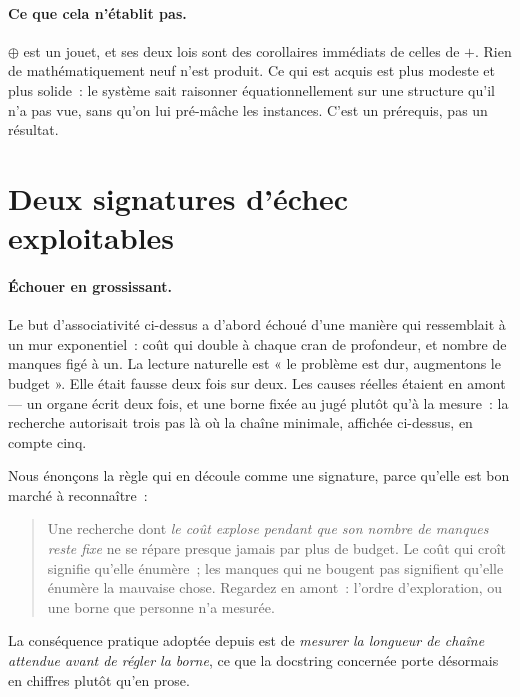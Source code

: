 \documentclass[11pt]{article}
\theoremstyle{remark}\newtheorem{remarque}{Remarque}
\begin{document}
\paragraph{Ce que cela n'établit pas.} $\oplus$ est un jouet, et ses deux lois sont des
corollaires immédiats de celles de $+$. Rien de mathématiquement neuf n'est produit. Ce
qui est acquis est plus modeste et plus solide~: le système sait raisonner
équationnellement sur une structure qu'il n'a pas vue, sans qu'on lui pré-mâche les
instances. C'est un prérequis, pas un résultat.

\section{Deux signatures d'échec exploitables}
\label{sec:signatures}

\paragraph{Échouer en grossissant.} Le but d'associativité ci-dessus a d'abord échoué
d'une manière qui ressemblait à un mur exponentiel~: coût qui double à chaque cran de
profondeur, et nombre de manques figé à un. La lecture naturelle est « le problème est
dur, augmentons le budget ». Elle était fausse deux fois sur deux. Les causes réelles
étaient en amont --- un organe écrit deux fois, et une borne fixée au jugé plutôt qu'à la
mesure~: la recherche autorisait trois pas là où la chaîne minimale, affichée ci-dessus,
en compte cinq.

Nous énonçons la règle qui en découle comme une signature, parce qu'elle est bon marché
à reconnaître~:

\begin{quote}
Une recherche dont \emph{le coût explose pendant que son nombre de manques reste fixe}
ne se répare presque jamais par plus de budget. Le coût qui croît signifie qu'elle
énumère~; les manques qui ne bougent pas signifient qu'elle énumère la mauvaise chose.
Regardez en amont~: l'ordre d'exploration, ou une borne que personne n'a mesurée.
\end{quote}

La conséquence pratique adoptée depuis est de \emph{mesurer la longueur de chaîne
attendue avant de régler la borne}, ce que la docstring concernée porte désormais en
chiffres plutôt qu'en prose.
\end{document}
